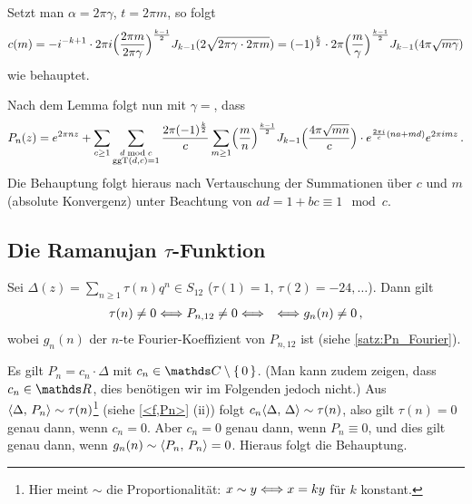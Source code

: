 \begin{bewe}
\begin{bewe}
Setzt man $\alpha = 2\pi \gamma$, $t = 2\pi m$, so folgt
\[
c(m) = -i^{-k+1} \cdot 2\pi i \Bigl( \frac{2\pi m}{2\pi \gamma}\Bigr)^{\frac{k-1}{2}} J_{k-1} (2\sqrt{2\pi \gamma \cdot 2 \pi m}) = (-1)^{\frac{k}{2}} \cdot 2\pi \Bigl(\frac{m}{\gamma}\Bigr)^{\frac{k-1}{2}} J_{k-1} (4\pi \sqrt{m\gamma})
\]
wie behauptet.


\end{bewe}

Nach dem Lemma folgt nun mit $\gamma = $, dass
\[
P_n(z) = e^{2\pi nz} + \sum_{c\geq1} \sum_{\substack{d \bmod c\\ \operatorname{ggT}(d,c) = 1}} \frac{2\pi (-1)^{\frac{k}{2}}}{c} \sum_{m\geq 1} \Bigl(\frac{m}{n}\Bigr)^{\frac{k-1}{2}} J_{k-1} \Bigl(\frac{4\pi \sqrt{mn}}{c}\Bigr) \cdot e^{\frac{2\pi i}{c}(na+md)} e^{2\pi imz}
\,.
\]
Die Behauptung folgt hieraus nach Vertauschung der Summationen über $c$ und $m$ (absolute Konvergenz) unter Beachtung von $ad = 1 + bc \equiv 1 \mod c$.

\end{bewe}

\subsection[Die Ramanujan \texorpdfstring{$\tau$}{tau}-Funktion]{Die Ramanujan {\boldmath $\tau$}-Funktion}

\begin{satz}
Sei $\Delta(z) = \sum_{n \geq 1} \tau(n) q^n \in S_{12}$ ($\tau(1) = 1$, $\tau(2) = -24, \ldots $).
Dann gilt
\begin{align*}
\tau(n) \not= 0 &\Longleftrightarrow P_{n,12} \not= 0 \Longleftrightarrow &\Longleftrightarrow g_n(n) \not= 0
\,,
\end{align*}
wobei $g_n(n)$ der $n$-te Fourier-Koeffizient von $P_{n,12}$ ist (siehe \autoref{satz:Pn_Fourier}).
\end{satz}
\begin{bewe}
Es gilt $P_n = c_n \cdot \Delta$ mit $c_n \in \CC \setminus \Set {0}$.
(Man kann zudem zeigen, dass $c_n \in \RR$, dies benötigen wir im Folgenden jedoch nicht.)
Aus $\scalarprd{\Delta}{P_n} \sim \tau(n)$\footnote{Hier meint $\sim$ die Proportionalität: $x \sim y \Longleftrightarrow x = ky$ für $k$ konstant.} (siehe \autoref{<f,Pn>} (ii)) folgt $c_n \scalarprd \Delta \Delta \sim \tau(n)$, also gilt $\tau(n) = 0$ genau dann, wenn $c_n = 0$. Aber $c_n = 0$ genau dann, wenn $P_n \equiv 0$, und dies gilt genau dann, wenn $g_n(n) \sim \scalarprd{P_n}{P_n} = 0$.
Hieraus folgt die Behauptung.
\end{bewe}


